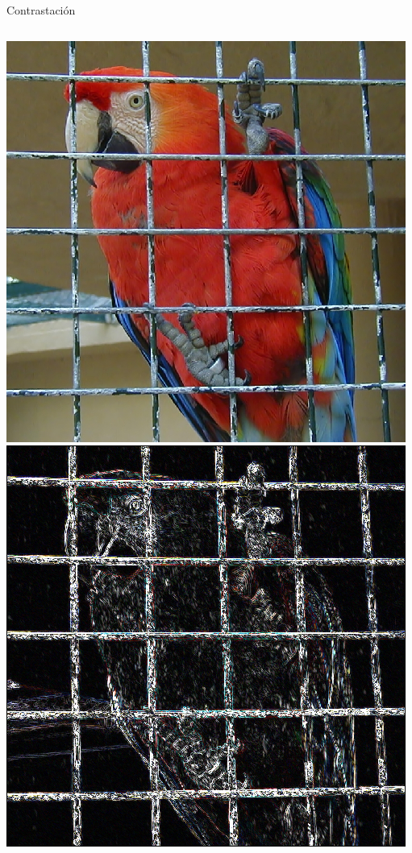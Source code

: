 \documentclass{beamer}
\begin{document}
\begin{frame}{Contrastación}
\begin{columns}
\column[t]{5cm}

\includegraphics[scale=0.18]{./.Presentation/parrot_original} \\
\includegraphics[scale=0.18]{./.Presentation/parrot_laplace} \\


\end{columns}
\end{frame}
\end{document}
